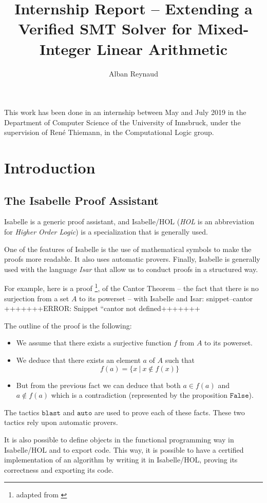 \documentclass{article}
\title{Internship Report -- Extending a Verified SMT Solver for Mixed-Integer
Linear Arithmetic}
\author{Alban Reynaud}
\date{}
\newcommand{\Snippet}[1]{%
  \ifcsname snippet--#1\endcsname{\csname snippet--#1\endcsname}%
  \else+++++++ERROR: Snippet ``#1 not defined+++++++ \fi}
\begin{document}
\maketitle

This work has been done in an internship between May and July 2019
in the Department of Computer Science
of the University of Innsbruck, under the supervision of René Thiemann, in the
Computational Logic group.

\tableofcontents

\section{Introduction}
\subsection{The Isabelle Proof Assistant}
Isabelle \cite{Isabelle} is a generic proof assistant, and Isabelle/HOL
(\textit{HOL} is an abbreviation for \textit{Higher Order Logic}) is a
specialization that is generally used.

One of the features of Isabelle is the use of mathematical symbols to make the
proofs more readable. It also uses automatic provers.
Finally, Isabelle is generally used with the language \textit{Isar} that allow
us to conduct proofs in a structured way.

For example, here is a proof
\footnote{adapted from \cite[Section 5.1]{ConcreteSemantics}},
of the Cantor Theorem -- the fact that there is no surjection from a set $A$ to
its powerset -- with Isabelle and Isar:
\Snippet{cantor}

The outline of the proof is the following:
\begin{itemize}
  \item We assume that there exists a surjective function $f$ from $A$ to
    its powerset.
  \item We deduce that there exists an element $a$ of $A$ such that
    $$f(a) = \{x~|~x \notin f(x)\}$$
  \item But from the previous fact we can deduce that both $a \in f(a)$ and $a
    \notin f(a)$ which is a contradiction (represented by the proposition
    $\mathtt{False}$).
\end{itemize}
The tactics $\mathtt{blast}$ and $\mathtt{auto}$
are used to prove each of these facts. These two tactics rely upon automatic
provers.

It is also possible to define objects in the functional programming way in
Isabelle/HOL and to export code. This way, it is possible to have a certified
implementation of an algorithm by writing it in Isabelle/HOL, proving its
correctness and exporting its code.
\end{document}

